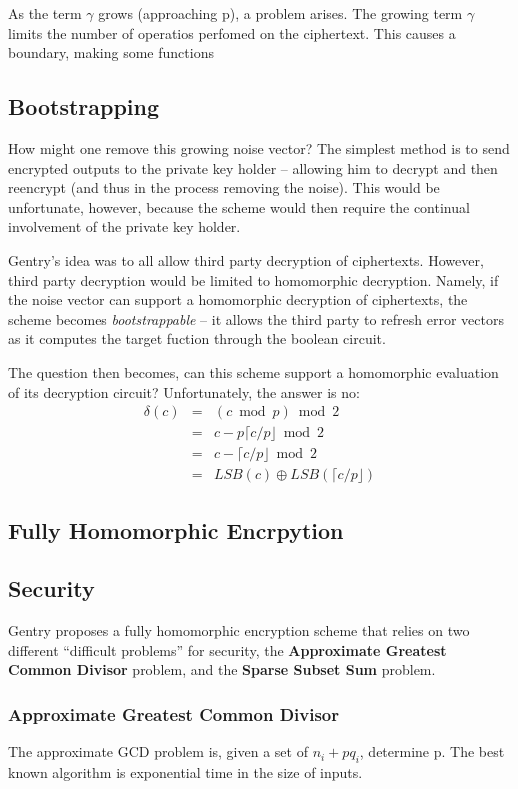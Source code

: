 \documentclass[a4paper,10pt]{article}
\begin{document}
As the term $\gamma$ grows (approaching p), a problem arises. The
growing term $\gamma$ limits the number of operatios perfomed on the
ciphertext. This causes a boundary, making some functions

\subsection{Bootstrapping}
How might one remove this growing noise vector? The simplest method is
to send encrypted outputs to the private key holder -- allowing him to
decrypt and then reencrypt (and thus in the process removing the noise).
This would be unfortunate, however, because the scheme would then
require the continual involvement of the private key holder.

Gentry's idea was to all allow third party decryption of ciphertexts.
However, third party decryption would be limited to homomorphic
decryption. Namely, if the noise vector can support a homomorphic
decryption of ciphertexts, the scheme becomes \textit{bootstrappable} --
it allows the third party to refresh error vectors as it computes
the target fuction through the boolean circuit.

The question then becomes, can this scheme support a homomorphic
evaluation of its decryption circuit? Unfortunately, the answer is
no:
\begin{eqnarray*}
\delta(c) &=& (c \bmod p) \bmod 2\\
&=& c - p \lceil c/p \rfloor \bmod 2\\
&=& c - \lceil c/p \rfloor \bmod 2\\
&=& LSB(c) \oplus LSB(\lceil c/p \rfloor)
\end{eqnarray*}


\subsection{Fully Homomorphic Encrpytion}

\subsection{Security}
Gentry proposes a fully homomorphic encryption scheme that relies on
two different ``difficult problems'' for security, the
\textbf{Approximate Greatest Common Divisor} problem, and the
\textbf{Sparse Subset Sum} problem.

\subsubsection{Approximate Greatest Common Divisor}
\label{app-gcd}
The approximate GCD problem is, given a set of $ n _{i} + pq_{i} $,
determine p. The best known algorithm is exponential time in the size
of inputs.
\end{document}
